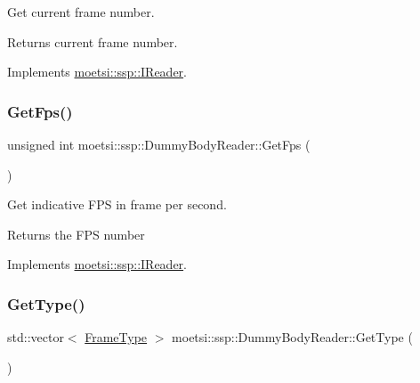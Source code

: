 Get current frame number. 

\begin{DoxyReturn}{Returns}
current frame number. 
\end{DoxyReturn}


Implements \hyperlink{classmoetsi_1_1ssp_1_1IReader_ac292d83eb06dee277baaa06e281a562d}{moetsi\+::ssp\+::\+I\+Reader}.

\mbox{\label{classmoetsi_1_1ssp_1_1DummyBodyReader_a7dab48cb8ec247add0c57d98e6cd5fb4}} 
\subsubsection{\texorpdfstring{Get\+Fps()}{GetFps()}}
{\footnotesize\ttfamily unsigned int moetsi\+::ssp\+::\+Dummy\+Body\+Reader\+::\+Get\+Fps (\begin{DoxyParamCaption}{ }\end{DoxyParamCaption})\hspace{0.3cm}{\ttfamily [virtual]}}



Get indicative F\+PS in frame per second. 

\begin{DoxyReturn}{Returns}
the F\+PS number 
\end{DoxyReturn}


Implements \hyperlink{classmoetsi_1_1ssp_1_1IReader_a9f6a8650ca290b011b8e5451eeae9f32}{moetsi\+::ssp\+::\+I\+Reader}.

\mbox{\label{classmoetsi_1_1ssp_1_1DummyBodyReader_a2219d7fd14ca1448fb4c6f2541ac3c9b}} 
\subsubsection{\texorpdfstring{Get\+Type()}{GetType()}}
{\footnotesize\ttfamily std\+::vector$<$ \hyperlink{namespacemoetsi_1_1ssp_a46efdfa2cd5a28ead465dcc8006b5a87}{Frame\+Type} $>$ moetsi\+::ssp\+::\+Dummy\+Body\+Reader\+::\+Get\+Type (\begin{DoxyParamCaption}{ }\end{DoxyParamCaption})\hspace{0.3cm}{\ttfamily [virtual]}}



